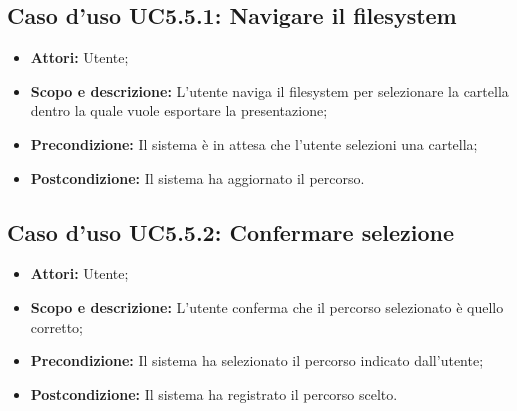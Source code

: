 	\subsection{Caso d'uso UC5.5.1: Navigare il filesystem}
	\begin{itemize}
		\item \textbf{Attori:} Utente;
		\item \textbf{Scopo e descrizione:} L'utente naviga il \gls{filesystem} per selezionare la cartella dentro la quale vuole esportare la presentazione;
		\item \textbf{Precondizione:} Il sistema è in attesa che l'utente selezioni una cartella;
		\item \textbf{Postcondizione:} Il sistema ha aggiornato il percorso.
	\end{itemize}

	\subsection{Caso d'uso UC5.5.2: Confermare selezione}
	\begin{itemize}
		\item \textbf{Attori:} Utente;
		\item \textbf{Scopo e descrizione:} L'utente conferma che il percorso selezionato è quello corretto;
		\item \textbf{Precondizione:} Il sistema ha selezionato il percorso indicato dall'utente;
		\item \textbf{Postcondizione:} Il sistema ha registrato il percorso scelto.
	\end{itemize}
